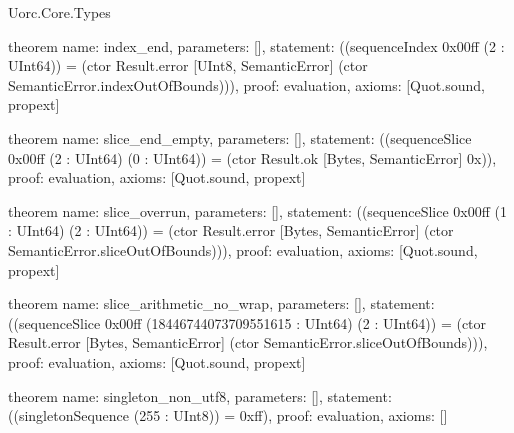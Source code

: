\begin{lexlean}{Uorc.Core.Types}
\begin{semanticmodule}
theorem{
  name: index_end,
  parameters: [],
  statement: ((sequenceIndex 0x00ff (2 : UInt64)) = (ctor Result.error [UInt8, SemanticError] (ctor SemanticError.indexOutOfBounds))),
  proof: evaluation{},
  axioms: [Quot.sound, propext]
}

theorem{
  name: slice_end_empty,
  parameters: [],
  statement: ((sequenceSlice 0x00ff (2 : UInt64) (0 : UInt64)) = (ctor Result.ok [Bytes, SemanticError] 0x)),
  proof: evaluation{},
  axioms: [Quot.sound, propext]
}

theorem{
  name: slice_overrun,
  parameters: [],
  statement: ((sequenceSlice 0x00ff (1 : UInt64) (2 : UInt64)) = (ctor Result.error [Bytes, SemanticError] (ctor SemanticError.sliceOutOfBounds))),
  proof: evaluation{},
  axioms: [Quot.sound, propext]
}

theorem{
  name: slice_arithmetic_no_wrap,
  parameters: [],
  statement: ((sequenceSlice 0x00ff (18446744073709551615 : UInt64) (2 : UInt64)) = (ctor Result.error [Bytes, SemanticError] (ctor SemanticError.sliceOutOfBounds))),
  proof: evaluation{},
  axioms: [Quot.sound, propext]
}

theorem{
  name: singleton_non_utf8,
  parameters: [],
  statement: ((singletonSequence (255 : UInt8)) = 0xff),
  proof: evaluation{},
  axioms: []
}
\end{semanticmodule}
\end{lexlean}
